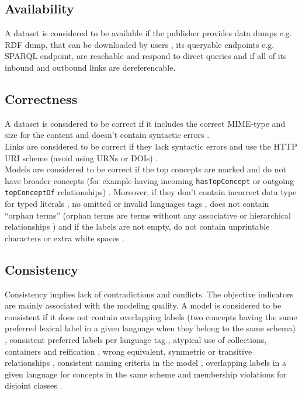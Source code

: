 \documentclass[onecolumn, crcready]{iosart2c}
\begin{document}
\subsection{Availability}

A dataset is considered to be available if the publisher provides data dumps e.g. RDF dump, that can be downloaded by users \cite{flemming2010}\cite{Hogan2010}, its queryable endpoints e.g. SPARQL endpoint, are reachable and respond to direct queries and if all of its inbound and outbound links are dereferencable.

\subsection{Correctness}

A dataset is considered to be correct if it includes the correct MIME-type and size for the content \cite{Hogan2010} and doesn't contain syntactic errors \cite{Hogan2010}.\\
Links are considered to be correct if they lack syntactic errors and use the HTTP URI scheme (avoid using URNs or DOIs) \cite{Mader2012}.\\
Models are considered to be correct if the top concepts are marked and do not have broader concepts (for example having incoming \texttt{hasTopConcept} or outgoing \texttt{topConceptOf} relationships) \cite{Mader2012}. Moreover, if they don't contain incorrect data type for typed literals \cite{Hogan2010}\cite{Acosta2013}, no omitted or invalid languages tags \cite{Suominen:2012:IQS:2413941.2413985}\cite{Mader2012}, does not contain ``orphan terms'' (orphan terms are terms without any associative or hierarchical relationships \cite{journals/ires/Living10}) and if the labels are not empty, do not contain unprintable characters \cite{Acosta2013}\cite{Mader2012} or extra white spaces \cite{Suominen:2012:IQS:2413941.2413985}.

\subsection{Consistency}

Consistency implies lack of contradictions and conflicts. The objective indicators are mainly associated with the modeling quality. A model is considered to be consistent if it does not contain overlapping labels (two concepts having the same preferred lexical label in a given language when they belong to the same schema) \cite{skosprimer}\cite{Mader2012}, consistent preferred labels per language tag \cite{Mader2012}\cite{Suominen:2012:IQS:2413941.2413985}, atypical use of collections, containers and reification \cite{Hogan2010}, wrong equivalent, symmetric or transitive relationships \cite{DBLP:conf/ic3k/KeetSP13}, consistent naming criteria in the model \cite{Mader2012}\cite{DBLP:conf/ic3k/KeetSP13}, overlapping labels in a given language for concepts in the same scheme \cite{Mader2012} and membership violations for disjoint classes \cite{Hogan2010}\cite{DBLP:conf/ic3k/KeetSP13}.
\end{document}
